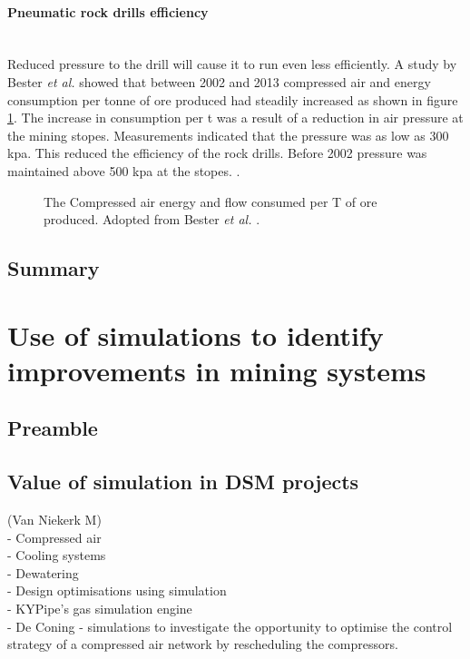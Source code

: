 		\paragraph{Pneumatic rock drills efficiency}\leavevmode\\
		Reduced pressure to the drill will cause it to run even less efficiently. A study by  Bester \textit{et al.} showed that between 2002 and 2013 compressed air and energy consumption per tonne of ore produced had steadily increased as shown in figure \ref{fig: Compressed energy and air flow per ton}. The increase in consumption per \gls{t} was a result of a reduction in air pressure at the mining stopes. Measurements indicated that the pressure was as low as 300 \gls{kpa}. This reduced the efficiency of the rock drills. Before 2002 pressure was maintained above 500 \gls{kpa} at the stopes.  .\cite{bester2013effect} \par
		\begin{figure}[h]
			\centering
			\fbox{}
			\caption[The Compressed air energy and flow consumed per T of ore produced.]{The Compressed air energy and flow consumed per T of ore produced. Adopted from Bester \textit{et al.} \cite{bester2013effect}.}
			\label{fig: Compressed energy and air flow per ton}
		\end{figure}
	\subsection{Summary}
\section{Use of simulations to identify improvements in mining systems}
	\subsection{Preamble}
	\subsection{Value of simulation in DSM projects}
		(Van Niekerk M)\\
		- Compressed air \\
		- Cooling systems\\
		- Dewatering\\
		- Design optimisations using simulation\\
 		- KYPipe’s gas simulation engine\\
		- De Coning -  simulations to investigate the opportunity to optimise the control strategy of a compressed air network by rescheduling the compressors.
